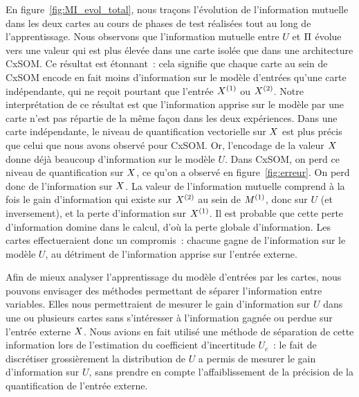 \documentclass[../main]{subfiles}
\begin{document}
En figure~\ref{fig:MI_evol_total}, nous traçons l'évolution de l'information mutuelle dans les deux cartes au cours de phases de test réalisées tout au long de l'apprentissage.
Nous observons que l'information mutuelle entre $U$ et $\Pi$ évolue vers une valeur qui est plus élevée dans une carte isolée que dans une architecture CxSOM.
Ce résultat est étonnant~: cela signifie que chaque carte au sein de CxSOM encode en fait moins d'information sur le modèle d'entrées qu'une carte indépendante, qui ne reçoit pourtant que l'entrée $X^{({1})}$ ou $X^{({2})}$.
Notre interprétation de ce résultat est que l'information apprise sur le modèle par une carte n'est pas répartie de la même façon dans les deux expériences.
Dans une carte indépendante, le niveau de quantification vectorielle sur $X$ est plus précis que celui que nous avons observé pour CxSOM.
Or, l'encodage de la valeur $X$ donne déjà beaucoup d'information sur le modèle $U$.
Dans CxSOM, on perd ce niveau de quantification sur $X$, ce qu'on a observé en figure~\ref{fig:erreur}. On perd donc de l'information sur $X$.
La valeur de l'information mutuelle comprend à la fois le gain d'information qui existe sur $X^{({2})}$ au sein de $M^{({1})}$, donc sur $U$ (et inversement), et la perte d'information sur $X^{({1})}$. 
Il est probable que cette perte d'information domine dans le calcul, d'où la perte globale d'information.
Les cartes effectueraient donc un compromis~: chacune gagne de l'information sur le modèle $U$, au détriment de l'information apprise sur l'entrée externe.

Afin de mieux analyser l'apprentissage du modèle d'entrées par les cartes, nous pouvons envisager des méthodes permettant de séparer l'information entre variables. Elles nous permettraient de mesurer le gain d'information sur $U$ dans une ou plusieurs cartes sans s'intéresser à l'information gagnée ou perdue sur l'entrée externe $X$.
Nous avions en fait utilisé une méthode de séparation de cette information lors de l'estimation du coefficient d'incertitude $U_c$~: le fait de discrétiser grossièrement la distribution de $U$ a permis de mesurer le gain d'information sur $U$, sans prendre en compte l'affaiblissement de la précision de la quantification de l'entrée externe.
\end{document}
